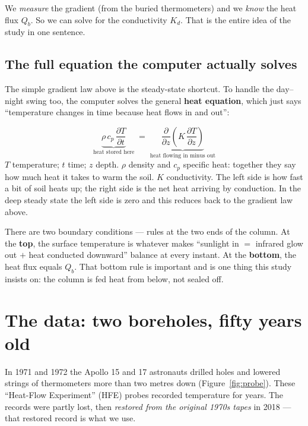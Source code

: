\documentclass[11pt]{article}
\begin{document}
\begin{plainbox}
We \emph{measure} the gradient (from the buried thermometers) and we
\emph{know} the heat flux $Q_b$. So we can solve for the conductivity
$K_d$. That is the entire idea of the study in one sentence.
\end{plainbox}

\subsection{The full equation the computer actually solves}

The simple gradient law above is the steady-state shortcut. To handle
the day--night swing too, the computer solves the general
\textbf{heat equation}, which just says ``temperature changes in time
because heat flows in and out'':

\begin{mathbox}
\[
\underbrace{\rho\,c_p\,\frac{\partial T}{\partial t}}_{\text{heat stored here}}
\;=\;
\underbrace{\frac{\partial}{\partial z}\!\left(K\,\frac{\partial T}{\partial z}\right)}_{\text{heat flowing in minus out}}
\]
\textbf{$T$} temperature; \textbf{$t$} time; \textbf{$z$} depth.
\textbf{$\rho$} density and \textbf{$c_p$} specific heat: together they
say how much heat it takes to warm the soil. \textbf{$K$} conductivity.
The left side is how fast a bit of soil heats up; the right side is the
net heat arriving by conduction. In the deep steady state the left side
is zero and this reduces back to the gradient law above.
\end{mathbox}

There are two boundary conditions --- rules at the two ends of the
column. At the \textbf{top}, the surface temperature is whatever makes
``sunlight in $=$ infrared glow out $+$ heat conducted downward'' balance
at every instant. At the \textbf{bottom}, the heat flux equals $Q_b$.
That bottom rule is important and is one thing this study insists on:
the column is fed heat from below, not sealed off.

\section{The data: two boreholes, fifty years old}

In 1971 and 1972 the Apollo 15 and 17 astronauts drilled holes and
lowered strings of thermometers more than two metres down
(Figure~\ref{fig:probe}). These ``Heat-Flow Experiment'' (HFE) probes
recorded temperature for years. The records were partly lost, then
\emph{restored from the original 1970s tapes} in 2018 --- that restored
record is what we use.
\end{document}
